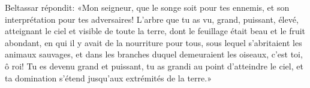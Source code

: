 Beltassar répondit: «Mon seigneur, que le songe soit pour tes ennemis,
	et son interprétation pour tes adversaires!
L’arbre que tu as vu, grand, puissant, élevé,
	atteignant le ciel et visible de toute la terre,
	dont le feuillage était beau et le fruit abondant,
	en qui il y avait de la nourriture pour tous,
	sous lequel s’abritaient les animaux sauvages,
	et dans les branches duquel demeuraient les oiseaux,
	c’est toi, ô roi!
Tu es devenu grand et puissant, tu as grandi au point d’atteindre le ciel,
	et ta domination s’étend jusqu’aux extrémités de la terre.»
